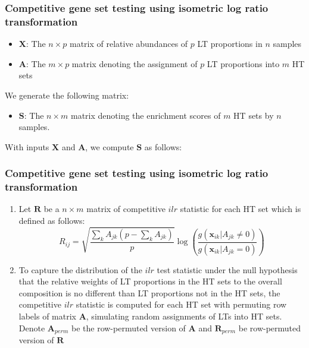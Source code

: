 \documentclass{beamer}
\begin{document}
\begin{frame}
    \frametitle{Competitive gene set testing using isometric log ratio transformation}
    \begin{itemize}
        \item $\bm X$: The $n \times p$ matrix of relative abundances of $p$ LT proportions in $n$ samples
        \item $\bm A$: The $m \times p$ matrix denoting the assignment of $p$ LT proportions into $m$ HT sets
    \end{itemize}
    We generate the following matrix: 
    \begin{itemize}
        \item $\bm S$: The $n \times m$ matrix denoting the enrichment scores of $m$ HT sets by $n$ samples. 
    \end{itemize}
\end{frame}


\begin{frame}
    With inputs $\bm{X}$ and $\bm{A}$, we compute $\bm{S}$ as follows:  
    \frametitle{Competitive gene set testing using isometric log ratio transformation}
    \begin{enumerate}
        \item Let $\bm{R}$ be a $n \times m$ matrix of competitive $ilr$ statistic for each HT set which is defined as follows:
        \begin{equation}
        R_{ij} = \sqrt{\frac{\sum_k A_{jk}(p - \sum_k A_{jk})}{p}} \log \left(\frac{g(\bm{x}_{ik} |A_{jk} \neq 0)}{g(\bm{x}_{ik} | A_{jk} = 0)}\right)
        \end{equation}
        \item To capture the distribution of the $ilr$ test statistic under the null hypothesis that the relative weights of LT proportions in the HT sets to the overall composition is no different than LT proportions not in the HT sets, the competitive $ilr$ statistic is computed for each HT set with permuting row labels of matrix $\bm{A}$, simulating random assignments of LTs into HT sets. Denote $\bm{A}_{perm}$ be the row-permuted version of $\bm{A}$ and $\bm{R}_{perm}$ be row-permuted version of $\bm{R}$
    \end{enumerate}
\end{frame}
\end{document}
